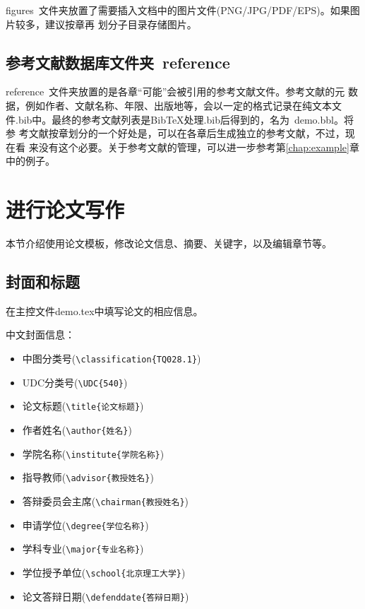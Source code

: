 figures~文件夹放置了需要插入文档中的图片文件(PNG/JPG/PDF/EPS)。如果图片较多，建议按章再
划分子目录存储图片。

\subsection{参考文献数据库文件夹~reference}
\label{sec:bibdir}

reference~文件夹放置的是各章``可能''会被引用的参考文献文件。参考文献的元
数据，例如作者、文献名称、年限、出版地等，会以一定的格式记录在纯文本文
件.bib中。最终的参考文献列表是BibTeX处理.bib后得到的，名为~demo.bbl。将参
考文献按章划分的一个好处是，可以在各章后生成独立的参考文献，不过，现在看
来没有这个必要。关于参考文献的管理，可以进一步参考第\ref{chap:example}章
中的例子。


\section{进行论文写作}
\label{sec:format}

本节介绍使用论文模板，修改论文信息、摘要、关键字，以及编辑章节等。

\subsection{封面和标题}
在主控文件demo.tex中填写论文的相应信息。

中文封面信息：
\begin{itemize}
\item 中图分类号(\verb|\classification{TQ028.1}|)
\item UDC分类号(\verb|\UDC{540}|)
\item 论文标题(\verb|\title{论文标题}|)
\item 作者姓名(\verb|\author{姓名}|)
\item 学院名称(\verb|\institute{学院名称}|)
\item 指导教师(\verb|\advisor{教授姓名}|)
\item 答辩委员会主席(\verb|\chairman{教授姓名}|)
\item 申请学位(\verb|\degree{学位名称}|)
\item 学科专业(\verb|\major{专业名称}|)
\item 学位授予单位(\verb|\school{北京理工大学}|)
\item 论文答辩日期(\verb|\defenddate{答辩日期}|)
\end{itemize}


